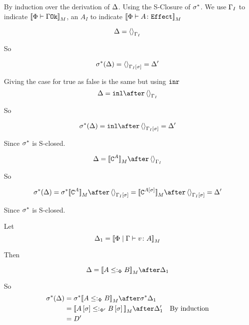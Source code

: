 \documentclass{report}
\newcommand\effect[0]{\texttt{Effect}}
\renewcommand\star[0]{^*}
\begin{document}
\proof
By induction over the derivation of $\Delta$. Using the S-Closure of $\si\star$. We use $\Gamma_I$ to indicate ${\bf [\![}\Phi\vdash \Gamma \texttt{Ok}{\bf ]\!]}_M$, an $A_I$ to indicate $\deno{\typerelation{\P}{A}{\effect}}$


\begin{equation}
    \Delta = \left\langle\right\rangle_{\Gamma_I}
\end{equation}

So

\begin{equation}
    \si\star(\D) = \term{\G_I\ssi} = \D'
\end{equation}

Giving the case for true as false is the same but using $\texttt{inr}$
\begin{equation}
    \D = \inl\after\term{\G_I}
\end{equation}

So

\begin{equation}
    \si\star(\D) = \inl\after \term{\G_I\ssi} = \D'
\end{equation}

Since $\si\star$ is S-closed.



\begin{equation}
    \D = \deno{\const{A}}\after\term{\G_I}
\end{equation}

So

\begin{equation}
    \si\star(\D) = \si\star\deno{\const{A}}\after \term{\G_I\ssi}=\deno{\const{A\ssi}}\after \term{\G_I\ssi}  = \D'
\end{equation}

Since $\si\star$ is S-closed.


Let \begin{equation}
    \Delta_1 = {\bf [\![}\Phi\mid\Gamma \vdash v \colon A{\bf ]\!]}_M
\end{equation}

Then

\begin{equation}
    \D = \deno{A\subtypep B}\after \D_1\\
\end{equation}

So 
\begin{align}
    \si\star(\D) & = \si\star{\deno{A\subtypep B}}\after\si\star\D_1 \\
    & = \deno{A\ssi\subtypepp B\ssi}\after\D_1'\qt{By induction}\\
    & = D'
\end{align}
\end{document}
